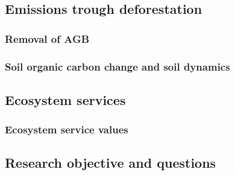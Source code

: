 \subsection{Emissions trough deforestation}
\subsubsection{Removal of AGB}
\subsubsection{Soil organic carbon change and soil dynamics}
\subsection{Ecosystem services}
\subsubsection{Ecosystem service values}
\subsection{Research objective and questions}
